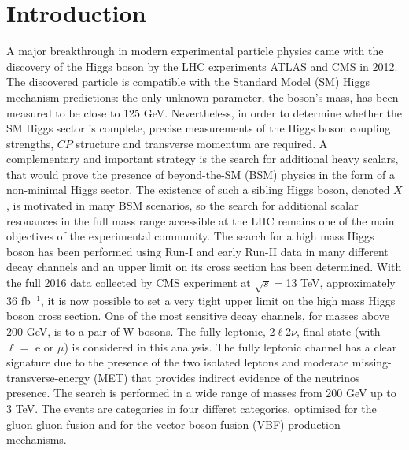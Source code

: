 \documentclass[PhD,binding=0.6cm]{../sapthesis}
\begin{document}
\chapter{Introduction}
A major breakthrough in modern experimental particle physics came with the discovery of the Higgs boson by the LHC experiments ATLAS and CMS in 2012.
The discovered particle is compatible with the Standard Model (SM) Higgs mechanism predictions: the only unknown parameter, the boson's mass, has been
measured to be  close to 125 GeV. Nevertheless, in order to determine whether the SM Higgs sector is complete, precise measurements of the Higgs boson coupling strengths, $CP$ structure and transverse momentum are required. 
A complementary and important strategy is the search for additional heavy
scalars, that would prove the presence of  beyond-the-SM (BSM) physics in
the form of a non-minimal Higgs sector. The existence of such a sibling Higgs boson,
denoted $X$, is motivated in many BSM scenarios, so the search for additional scalar resonances in the full
mass range accessible at the LHC remains one of the main objectives of the experimental community.
The search for a high mass Higgs boson has been performed using Run-I and
early Run-II data in many different decay channels and an upper limit on its
cross section has been determined. With the full 2016 data collected by CMS
experiment at $\sqrt{s}=$13 TeV, approximately  36 fb$^{-1}$, it is now possible to set a very tight upper limit on the high mass Higgs boson cross section.
One of the most sensitive decay channels, for masses above 200 GeV, is to a pair of W bosons. 
The fully leptonic, 2$\ell$2$\nu$,  final state (with $\ell =$ e or $\mu$) is considered in this analysis.
The fully leptonic channel has a clear signature due to the presence of the two isolated leptons and moderate missing-transverse-energy (MET) that provides indirect evidence of the neutrinos presence.
The search is performed in a wide range of masses from 200 GeV up to 3 TeV.
The  events are categories in four differet categories, optimised for the gluon-gluon fusion and for the vector-boson fusion (VBF) production mechanisms.
\end{document}
